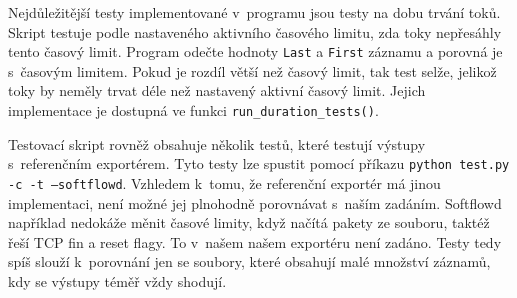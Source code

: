 \documentclass[a4paper, 11pt]{article}
\begin{document}
\begin{sloppypar}
\begin{lstlisting}[language=json, caption={Ukázka logu z~kolektoru}, label={lst1}]
\end{lstlisting}

Nejdůležitější testy implementované v~programu jsou testy na dobu trvání toků. Skript testuje podle nastaveného aktivního časového limitu, zda toky nepřesáhly tento časový limit. Program odečte hodnoty \texttt{Last} a \texttt{First} záznamu a porovná je s~časovým limitem. Pokud je rozdíl větší než časový limit, tak test selže, jelikož toky by neměly trvat déle než nastavený aktivní časový limit. Jejich implementace je dostupná ve funkci \texttt{run\_duration\_tests()}.

Testovací skript rovněž obsahuje několik testů, které testují výstupy s~referenčním exportérem. Tyto testy lze spustit pomocí příkazu \texttt{python test.py -c -t --softflowd}. Vzhledem k~tomu, že referenční exportér má jinou implementaci, není možné jej plnohodně porovnávat s~naším zadáním. Softflowd například nedokáže měnit časové limity, když načítá pakety ze souboru, taktéž řeší TCP fin a reset flagy. To v~našem našem exportéru není zadáno. Testy tedy spíš slouží k~porovnání jen se soubory, které obsahují malé množství záznamů, kdy se výstupy téměř vždy shodují.
\newpage



\end{sloppypar}
\end{document}
